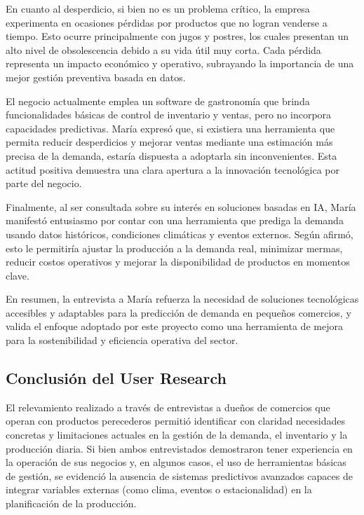 \indent En cuanto al desperdicio, si bien no es un problema crítico, la empresa experimenta en ocasiones pérdidas por productos que no logran venderse a tiempo. Esto ocurre principalmente con jugos y postres, los cuales presentan un alto nivel de obsolescencia debido a su vida útil muy corta. Cada pérdida representa un impacto económico y operativo, subrayando la importancia de una mejor gestión preventiva basada en datos.

\indent El negocio actualmente emplea un software de gastronomía que brinda funcionalidades básicas de control de inventario y ventas, pero no incorpora capacidades predictivas. María expresó que, si existiera una herramienta que permita reducir desperdicios y mejorar ventas mediante una estimación más precisa de la demanda, estaría dispuesta a adoptarla sin inconvenientes. Esta actitud positiva demuestra una clara apertura a la innovación tecnológica por parte del negocio.

\indent Finalmente, al ser consultada sobre su interés en soluciones basadas en IA, María manifestó entusiasmo por contar con una herramienta que prediga la demanda usando datos históricos, condiciones climáticas y eventos externos. Según afirmó, esto le permitiría ajustar la producción a la demanda real, minimizar mermas, reducir costos operativos y mejorar la disponibilidad de productos en momentos clave.

\indent En resumen, la entrevista a María refuerza la necesidad de soluciones tecnológicas accesibles y adaptables para la predicción de demanda en pequeños comercios, y valida el enfoque adoptado por este proyecto como una herramienta de mejora para la sostenibilidad y eficiencia operativa del sector.


\subsection{Conclusión del User Research}

\indent El relevamiento realizado a través de entrevistas a dueños de comercios que operan con productos perecederos permitió identificar con claridad necesidades concretas y limitaciones actuales en la gestión de la demanda, el inventario y la producción diaria. Si bien ambos entrevistados demostraron tener experiencia en la operación de sus negocios y, en algunos casos, el uso de herramientas básicas de gestión, se evidenció la ausencia de sistemas predictivos avanzados capaces de integrar variables externas (como clima, eventos o estacionalidad) en la planificación de la producción.

